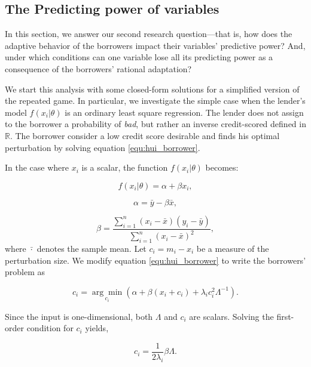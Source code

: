 \documentclass[12pt]{article} %
\begin{document}
\subsection{The Predicting power of variables}
\label{sec:close_form_introduction}
In this section, we answer our second research question---that is, how does the adaptive behavior of the borrowers impact their variables’ predictive power? And, under which conditions can one variable lose all its predicting power as a consequence of the borrowers' rational adaptation?

We start this analysis with some closed-form solutions for a simplified version of the repeated game. In particular, we investigate the simple case when the lender's model $f(x_i|\theta)$ is an ordinary least square regression. The lender does not assign to the borrower a probability of \textit{bad}, but rather an inverse credit-scored defined in $\mathbb{R}$. The borrower consider a low credit score desirable and finds his optimal perturbation by solving equation \ref{equ:hui_borrower}. 

In the case where $x_i$ is a scalar, the function $f(x_i|\theta)$ becomes: 

\begin{equation}
f(x_i|\theta) = \alpha + \beta x_i,
\end{equation}

\begin{equation}
\alpha = \bar{y}-\beta \bar{x},
\end{equation}

\begin{equation}
\beta=\frac{\sum_{i=1}^{n}\left(x_{i}-\bar{x}\right)\left(y_{i}-\bar{y}\right)}{\sum_{i=1}^{n}\left(x_{i}-\bar{x}\right)^{2}},
\end{equation}
where $\bar{\cdot}$ denotes the sample mean. Let $c_i=m_i-x_i$ be a measure of the perturbation size. We modify equation \eqref{equ:hui_borrower} to write the borrowers' problem as

\begin{equation}
c_i = \underset{c_i}{\arg \min } \left( \alpha + \beta(x_i+c_i)+\lambda_i c_i^2 \Lambda^{-1} \right).
\end{equation}

Since the input is one-dimensional, both $\Lambda$ and $c_i$ are scalars. Solving the first-order condition for $c_i$ yields,

\begin{equation}
c_i = \frac{1}{2 \lambda_i}\beta \Lambda.
\end{equation} 
\end{document}
